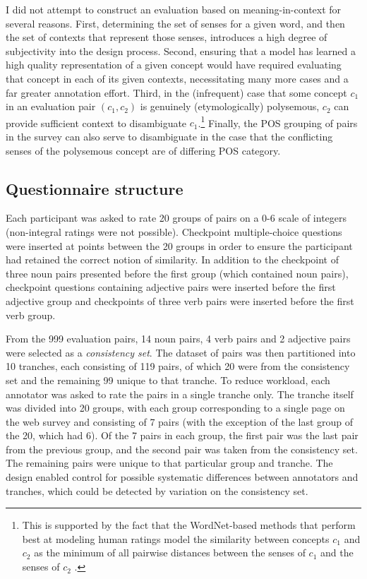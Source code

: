 I did not attempt to construct an evaluation based on meaning-in-context for several reasons. First, determining the set of senses for a given word, and then the set of contexts that represent those senses, introduces a high degree of subjectivity into the design process. Second, ensuring that a model has learned a high quality representation of a given concept would have required evaluating that concept in each of its given contexts, necessitating many more cases and a far greater annotation effort. Third, in the (infrequent) case that some concept \(c_1\) in an evaluation pair \((c_1,c_2)\) is genuinely (etymologically) polysemous, \( c_2 \) can provide sufficient context to disambiguate \(c_1\).\footnote{This is supported by the fact that the WordNet-based methods that perform best at modeling human ratings  model the similarity between concepts \( c_1 \) and \( c_2 \) as the minimum of all pairwise distances between the senses of \(c_1\) and the senses of \(c_2\) \citep{resnik1995using,pedersen2004wordnet}.} Finally, the POS grouping of pairs in the survey can also serve to disambiguate in the case that the conflicting senses of the polysemous concept are of differing POS category.

\subsection{Questionnaire structure}

Each participant was asked to rate 20 groups of pairs on a 0-6 scale of integers (non-integral ratings were not possible). Checkpoint multiple-choice questions were inserted at points between the 20 groups in order to ensure the participant had retained the correct notion of similarity. In addition to the checkpoint of three noun pairs presented before the first group (which contained noun pairs), checkpoint questions containing adjective pairs were inserted before the first adjective group and checkpoints of three verb pairs were inserted before the first verb group.     

From the 999 evaluation pairs, 14 noun pairs, 4 verb pairs and 2 adjective pairs were selected as a \emph{consistency set}. The dataset of pairs was then partitioned into 10 tranches, each consisting of 119 pairs, of which 20 were from the consistency set and the remaining 99 unique to that tranche. To reduce workload, each annotator was asked to rate the pairs in a single tranche only. The tranche itself was divided into 20 groups, with each group corresponding to a single page on the web survey and consisting of 7 pairs (with the exception of the last group of the 20, which had 6). Of the 7 pairs in each group, the first pair was the last pair from the previous group, and the second pair was taken from the consistency set. The remaining pairs were unique to that particular group and tranche. The design enabled control for possible systematic differences between annotators and tranches, which could be detected by variation on the consistency set. 


